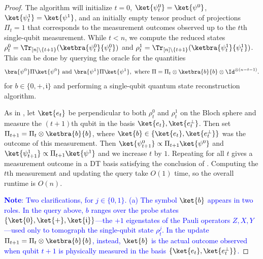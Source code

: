 \begin{proof}
    The algorithm will initialize $t=0$, $\ket{\smash{\psi^0_t}}=\ket{\smash{\psi^0}}$, $\ket{\smash{\psi^1_t}}=\ket{\smash{\psi^1}}$, and an initially empty tensor product of projections $\Pi_t=1$ that corresponds to the measurement outcomes observed up to the $t$th single-qubit measurement. While $t<n$, we compute the reduced states $\rho^0_t = \Tr_{[n]\setminus \{t+1\}}(\ketbra{\smash{\psi^0_t}}{\smash{\psi^0_t}})$ and $\rho^1_t = \Tr_{[n]\setminus \{t+1\}}(\ketbra{\smash{\psi^1_t}}{\smash{\psi^1_t}})$. This can be done by querying the oracle for the quantities
    \begin{align*}
        \bra{\smash{\psi^0}}\Pi\ket{\smash{\psi^0}}\text{ and }\bra{\smash{\psi^1}}\Pi\ket{\smash{\psi^1}},\text{ where }\Pi = \Pi_t \otimes \ketbra{b}{b} \otimes \Id^{\otimes (n - t - 1)}.
    \end{align*}
    for $b\in\{0,+,\mathfrak{i}\}$ and performing a single-qubit quantum state reconstruction algorithm. 
    
    As in , let $\ket{e_t}$ be perpendicular to both $\rho^0_t$ and $\rho^1_t$ on the Bloch sphere and measure the $(t+1)$th qubit in the basis $\ket{e_t},\ket{\smash{e_t^\perp}}$. Then set $\Pi_{t+1}=\Pi_t \otimes\ketbra{b}{b}$, where $\ket{b}\in \{\ket{e_t},\ket{\smash{e^\perp_t}}\}$ was the outcome of this measurement. Then $\ket{\smash{\psi^0_{t+1}}}\propto\Pi_{t+1}\ket{\smash{\psi^0}}$ and $\ket{\smash{\psi^1_{t+1}}}\propto\Pi_{t+1}\ket{\smash{\psi^1}}$ and we increase $t$ by $1$. Repeating for all $t$ gives a measurement outcome in a DT basis satisfying the conclusion of . Computing the $t$th measurement and updating the query take $O(1)$ time, so the overall runtime is $O(n)$.

\textcolor{blue}{\textbf{Note}: Two clarifications, for $j\in\{0,1\}$. 
(a) The symbol $\ket{b}$ appears in two roles. In the query above, 
$b$ ranges over the probe states $\{\ket{0},\ket{+},\ket{\mathfrak{i}}\}$---the 
$+1$ eigenstates of the Pauli operators $Z,X,Y$---used only to 
tomograph the single-qubit state $\rho^j_t$. 
In the update $\Pi_{t+1}=\Pi_t\otimes\ketbra{b}{b}$, instead, 
$\ket{b}$ is the actual outcome observed when qubit 
$t+1$ is physically measured in the basis $\{\ket{e_t},\ket{\smash{e_t^\perp}}\}$.}


\end{proof}
